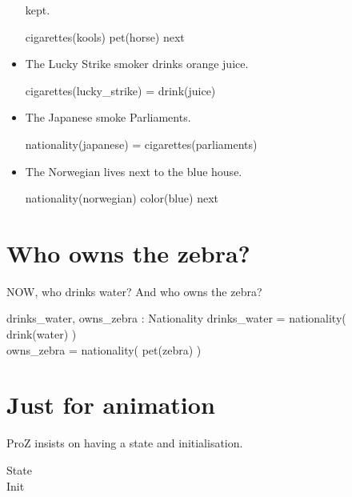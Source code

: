 \documentclass{article}
\begin{document}
\begin{itemize}
  kept.
  \begin{zed}
    cigarettes(kools) \mapsto pet(horse) \in next
  \end{zed}
\item The Lucky Strike smoker drinks orange juice.
  \begin{zed}
    cigarettes(lucky\_strike) = drink(juice)
  \end{zed}
\item The Japanese smoke Parliaments.
  \begin{zed}
    nationality(japanese) = cigarettes(parliaments)
  \end{zed}
\item The Norwegian lives next to the blue house.
  \begin{zed}
    nationality(norwegian) \mapsto color(blue) \in next
  \end{zed}
\end{itemize}

\section{Who owns the zebra?}
NOW, who drinks water? And who owns the zebra?
\begin{axdef}
  drinks\_water, owns\_zebra : Nationality
  \where
  drinks\_water = nationality\inv( drink(water) ) \\
  owns\_zebra = nationality\inv( pet(zebra) ) \\
\end{axdef}

\section{Just for animation}
ProZ insists on having a state and initialisation.
\begin{zed}
  State  \\
  Init \\
\end{zed}
\end{document}
